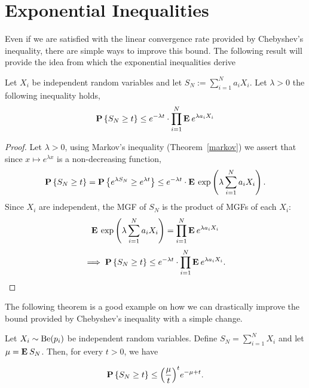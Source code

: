 \chapter{Exponential Inequalities}

Even if we are satisfied with the linear convergence rate provided by Chebyshev's inequality, there are simple ways to improve this bound. The following result will provide the idea from which the exponential inequalities derive

\begin{theorem}\label{mgf}
  Let $X_i$ be independent random variables and let $S_N := \sum_{i = 1}^N a_i X_i$. Let $\lambda > 0$ the following inequality holds,
  \[ \P\left\{  S_N \geq t\right\} \leq e^{-\lambda t}\cdot \prod_{i = 1}^N \E e^{\lambda a_i X_i} \] 

\end{theorem}

\begin{proof}
  Let $\lambda > 0$, using Markov's inequality (Theorem~\ref{markov}) we assert that since $x\mapsto e^{\lambda x}$ is a non-decreasing function,
  \[ \P\left\{  S_N \geq t\right\} = \P\left\{  e^{\lambda S_N} \geq e^{\lambda t}\right\} \leq e^{-\lambda t} \cdot \E \exp\left( \lambda \sum_{i = 1}^N a_i X_i \right). \]
  Since $X_i$ are independent, the MGF of $S_N$ is the product of MGFs of each $X_i$:
  \[\E \exp\left( \lambda \sum_{i = 1}^N a_i X_i \right) = \prod_{i = 1}^N \E e^{\lambda a_i X_i} \] 
  \[ \implies \P\left\{  S_N \geq t\right\} \leq e^{-\lambda t}\cdot \prod_{i = 1}^N \E e^{\lambda a_i X_i}. \]
\end{proof}

The following theorem is a good example on how we can drastically improve the bound provided by Chebyshev's inequality with a simple change.

\begin{theorem}\label{chernoff:bernoulli}
  Let $X_i \sim \Be(p_i)$ be independent random variables. Define $S_N = \sum_{i = 1}^{N} X_i$ and let $\mu = \E S_N$. Then, for every $t > 0$, we have
  
  \[ \P\left\{  S_N \geq t\right\} \leq  {\left(\frac{\mu}{t}\right)}^t e^{-\mu+t} .\] 
\end{theorem}

